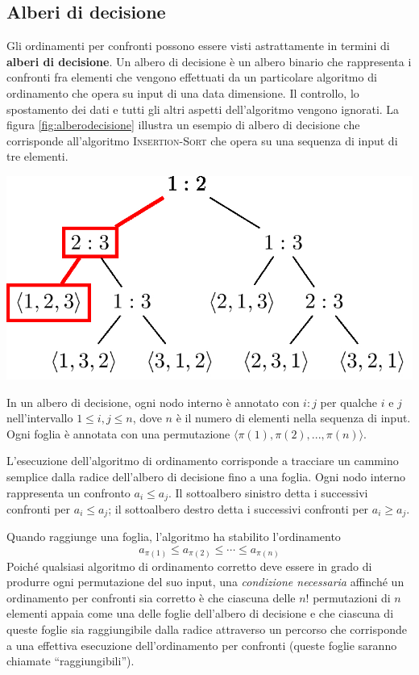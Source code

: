 \subsection{Alberi di decisione}
Gli ordinamenti per confronti possono essere visti astrattamente in termini di \textbf{alberi di decisione}. Un albero di decisione è un albero binario che rappresenta i confronti fra elementi che vengono effettuati da un particolare algoritmo di ordinamento che opera su input di una data dimensione. Il controllo, lo spostamento dei dati e tutti gli altri aspetti dell'algoritmo vengono ignorati.  La figura \ref{fig:alberodecisione} illustra un esempio di albero di decisione che corrisponde all'algoritmo \textsc{Insertion-Sort} che opera su una sequenza di input di tre elementi.

\begin{center}
	\includegraphics[scale=.35]{res/test.jpg}
	\label{fig:alberodecisione}
\end{center}

In un albero di decisione, ogni nodo interno è annotato con $i:j$ per qualche $i$ e $j$ nell'intervallo $1 \leq i,j \leq n$, dove $n$ è il numero di elementi nella sequenza di input. Ogni foglia è annotata con una permutazione $\langle \pi(1),\pi(2),...,\pi(n) \rangle$.

L'esecuzione dell'algoritmo di ordinamento corrisponde a tracciare un cammino semplice dalla radice dell'albero di decisione fino a una foglia. Ogni nodo interno rappresenta un confronto $a_{i} \leq a_{j}$. Il sottoalbero sinistro detta i successivi confronti per $a_{i}\leq a_{j}$; il sottoalbero destro detta i successivi confronti per $a_{i}\geq a_{j}$.

Quando raggiunge una foglia, l'algoritmo ha stabilito l'ordinamento $$a_{\pi(1)} \leq a_{\pi(2)} \leq \cdots \leq a_{\pi(n)}$$ Poiché qualsiasi algoritmo di ordinamento corretto deve essere in grado di produrre ogni permutazione del suo input, una \textit{condizione necessaria} affinché un ordinamento per confronti sia corretto è che ciascuna delle $n!$ permutazioni di $n$ elementi appaia come una delle foglie dell'albero di decisione e che ciascuna di queste foglie sia raggiungibile dalla radice attraverso un percorso che corrisponde a una effettiva esecuzione dell'ordinamento per confronti (queste foglie saranno chiamate ``raggiungibili'').

